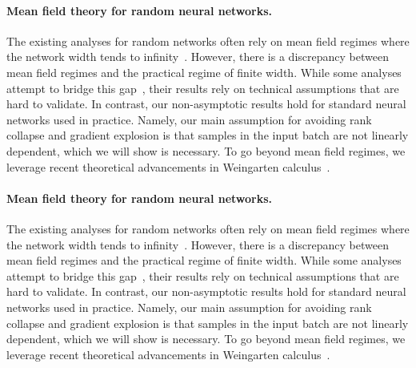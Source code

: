 \paragraph{Mean field theory for random neural networks.} 
The existing analyses for random networks often rely on mean field regimes where the network width tends to infinity~\citep{pennington2017resurrecting,yang2018a,li2022neural,pennington2017nonlinear}. However, there is a discrepancy between mean field regimes and the practical regime of finite width. While some analyses attempt to bridge this gap~\citep{joudaki2023bridging,daneshmand2021batch}, their results rely on technical assumptions that are hard to validate. In contrast, our non-asymptotic results hold for standard neural networks used in practice. Namely, our main assumption for avoiding rank collapse and gradient explosion is that samples in the input batch are not linearly dependent, which we will show is necessary. To go beyond mean field regimes, we leverage recent theoretical advancements in Weingarten calculus~\citep{weingarten1978asymptotic, collins2003moments, banica2011polynomial, collins2006integration, collins2022weingarten}.


\paragraph{Mean field theory for random neural networks.}\label{grad:sec:supp_rel_work}
The existing analyses for random networks often rely on mean field regimes where the network width tends to infinity~\citep{pennington2017resurrecting,yang2018a,li2022neural,pennington2017nonlinear}. However, there is a discrepancy between mean field regimes and the practical regime of finite width. While some analyses attempt to bridge this gap~\citep{joudaki2023bridging,daneshmand2021batch}, their results rely on technical assumptions that are hard to validate. In contrast, our non-asymptotic results hold for standard neural networks used in practice. Namely, our main assumption for avoiding rank collapse and gradient explosion is that samples in the input batch are not linearly dependent, which we will show is necessary. To go beyond mean field regimes, we leverage recent theoretical advancements in Weingarten calculus~\citep{weingarten1978asymptotic, collins2003moments, banica2011polynomial, collins2006integration, collins2022weingarten}.

% 
